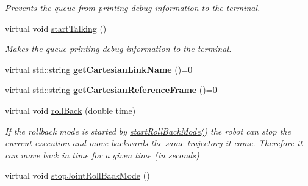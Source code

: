 \begin{DoxyCompactItemize}
\begin{DoxyCompactList}\small\item\em Prevents the queue from printing debug information to the terminal. \end{DoxyCompactList}\item 
virtual void \hyperlink{classkukadu_1_1ControlQueue_ac9042952868522099628074d22d61742}{start\+Talking} ()\hypertarget{classkukadu_1_1ControlQueue_ac9042952868522099628074d22d61742}{}\label{classkukadu_1_1ControlQueue_ac9042952868522099628074d22d61742}

\begin{DoxyCompactList}\small\item\em Makes the queue printing debug information to the terminal. \end{DoxyCompactList}\item 
virtual std\+::string {\bfseries get\+Cartesian\+Link\+Name} ()=0\hypertarget{classkukadu_1_1ControlQueue_a2939df4d9c60670b369bc435e5a255be}{}\label{classkukadu_1_1ControlQueue_a2939df4d9c60670b369bc435e5a255be}

\item 
virtual std\+::string {\bfseries get\+Cartesian\+Reference\+Frame} ()=0\hypertarget{classkukadu_1_1ControlQueue_ab3c95f38ed8c6821191f6877d464e515}{}\label{classkukadu_1_1ControlQueue_ab3c95f38ed8c6821191f6877d464e515}

\item 
virtual void \hyperlink{classkukadu_1_1ControlQueue_a650c486b9f78d3dec1db8741b575a0ab}{roll\+Back} (double time)
\begin{DoxyCompactList}\small\item\em If the rollback mode is started by \hyperlink{classkukadu_1_1ControlQueue_acb6ba5c61e9c26dcaa8e4073946e3791}{start\+Roll\+Back\+Mode()} the robot can stop the current execution and move backwards the same trajectory it came. Therefore it can move back in time for a given time (in seconds) \end{DoxyCompactList}\item 
virtual void \hyperlink{classkukadu_1_1ControlQueue_a38ba0b9fffb0fff6d39d742b1a2eb76b}{stop\+Joint\+Roll\+Back\+Mode} ()\hypertarget{classkukadu_1_1ControlQueue_a38ba0b9fffb0fff6d39d742b1a2eb76b}{}\label{classkukadu_1_1ControlQueue_a38ba0b9fffb0fff6d39d742b1a2eb76b}


\end{DoxyCompactItemize}

